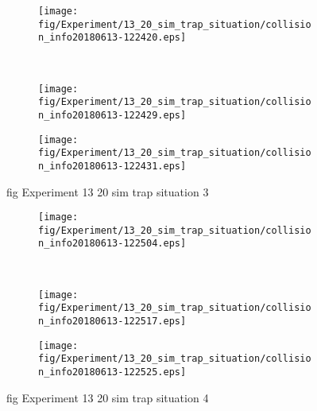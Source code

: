 \begin{figure}[H]
	\centering
	\begin{subfigure}[b]{0.45\textwidth}
		\texttt{[image: fig/Experiment/13\_20\_sim\_trap\_situation/collision\_info20180613-122420.eps]}
		\caption{}
		\label{fig:Experiment:13_20_sim_trap_situation:collision_info20180613-122420}
	\end{subfigure}
	~
	\begin{subfigure}[b]{0.45\textwidth}
		\texttt{[image: fig/Experiment/13\_20\_sim\_trap\_situation/collision\_info20180613-122429.eps]}
		\caption{}
		\label{fig:Experiment:13_20_sim_trap_situation:collision_info20180613-122429}
	\end{subfigure}

	\begin{subfigure}[b]{0.45\textwidth}
		\texttt{[image: fig/Experiment/13\_20\_sim\_trap\_situation/collision\_info20180613-122431.eps]}
		\caption{}
		\label{fig:Experiment:13_20_sim_trap_situation:collision_info20180613-122431}
	\end{subfigure}
	\caption{fig Experiment 13 20 sim trap situation 3}
	\label{fig:Experiment:13_20_sim_trap_situation:3}
\end{figure}

\begin{figure}[H]
	\centering
	\begin{subfigure}[b]{0.45\textwidth}
		\texttt{[image: fig/Experiment/13\_20\_sim\_trap\_situation/collision\_info20180613-122504.eps]}
		\caption{}
		\label{fig:Experiment:13_20_sim_trap_situation:collision_info20180613-122504}
	\end{subfigure}
	~
	\begin{subfigure}[b]{0.45\textwidth}
		\texttt{[image: fig/Experiment/13\_20\_sim\_trap\_situation/collision\_info20180613-122517.eps]}
		\caption{}
		\label{fig:Experiment:13_20_sim_trap_situation:collision_info20180613-122517}
	\end{subfigure}

	\begin{subfigure}[b]{0.45\textwidth}
		\texttt{[image: fig/Experiment/13\_20\_sim\_trap\_situation/collision\_info20180613-122525.eps]}
		\caption{}
		\label{fig:Experiment:13_20_sim_trap_situation:collision_info20180613-122525}
	\end{subfigure}
	\caption{fig Experiment 13 20 sim trap situation 4}
	\label{fig:Experiment:13_20_sim_trap_situation:4}
\end{figure}

